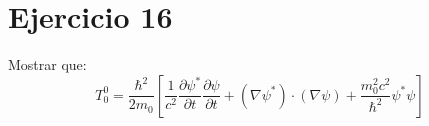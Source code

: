 \section*{Ejercicio 16}
Mostrar que:
\begin{equation*}
    T_0^0 = \frac{\hbar^2}{2m_0} \left[\frac{1}{c^2} \frac{\partial \psi^*}{\partial t}\frac{\partial \psi}{\partial t}+ \left(\nabla \psi^*\right)\cdot \left(\nabla \psi \right)+ \frac{m_0^2c^2}{\hbar^2} \psi^* \psi \right]  
\end{equation*}